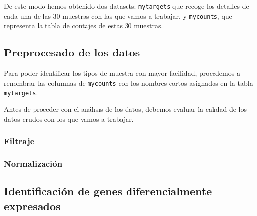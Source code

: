\documentclass[
  english,
]{article}
\newenvironment{Shaded}{\begin{snugshade}}{\end{snugshade}}
\newcommand{\CommentTok}[1]{\textcolor[rgb]{0.56,0.35,0.01}{\textit{#1}}}
\newcommand{\ErrorTok}[1]{\textcolor[rgb]{0.64,0.00,0.00}{\textbf{#1}}}
\newcommand{\KeywordTok}[1]{\textcolor[rgb]{0.13,0.29,0.53}{\textbf{#1}}}
\newcommand{\NormalTok}[1]{#1}
\newcommand{\OperatorTok}[1]{\textcolor[rgb]{0.81,0.36,0.00}{\textbf{#1}}}
\newcommand{\StringTok}[1]{\textcolor[rgb]{0.31,0.60,0.02}{#1}}
\begin{document}
De este modo hemos obtenido dos datasets: \texttt{mytargets} que recoge
los detalles de cada una de las 30 muestras con las que vamos a
trabajar, y \texttt{mycounts}, que representa la tabla de contajes de
estas 30 muestras.

\hypertarget{preprocesado-de-los-datos}{%
\subsection{Preprocesado de los datos}\label{preprocesado-de-los-datos}}

Para poder identificar los tipos de muestra con mayor facilidad,
procedemos a renombrar las columnas de \texttt{mycounts} con los nombres
cortos asignados en la tabla \texttt{mytargets}.

\begin{Shaded}
\end{Shaded}

Antes de proceder con el análisis de los datos, debemos evaluar la
calidad de los datos crudos con los que vamos a trabajar.

\hypertarget{filtraje}{%
\subsubsection{Filtraje}\label{filtraje}}

\hypertarget{normalizaciuxf3n}{%
\subsubsection{Normalización}\label{normalizaciuxf3n}}

\hypertarget{identificaciuxf3n-de-genes-diferencialmente-expresados}{%
\subsection{Identificación de genes diferencialmente
expresados}\label{identificaciuxf3n-de-genes-diferencialmente-expresados}}
\end{document}
